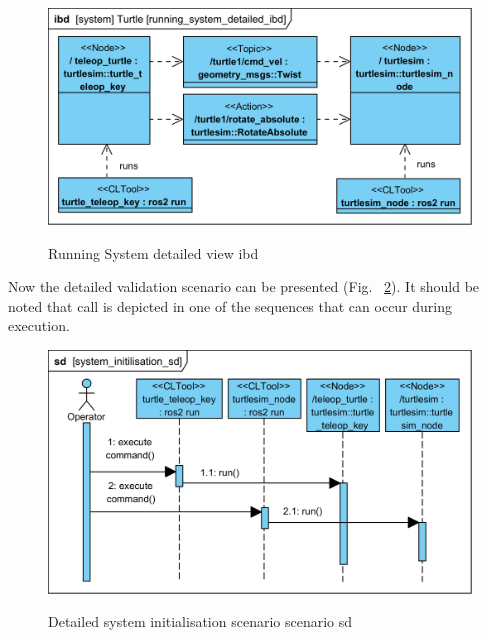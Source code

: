 \documentclass[11pt,oneside,a4paper]{report}
\begin{document}
\begin{figure}[H]
	\centering
	\begin{center}
		{\includegraphics[scale=.9]{diagrams/running_system_detailed_ibd.png}}
	\end{center}
	\caption{Running System detailed view ibd}
	\label{fig:running_system_detailed_ibd}
\end{figure}
			
Now the detailed validation scenario can be presented (Fig.~ \ref{fig:system_initilisation_sd}). It should be noted that \stAction{} call is depicted in one of the sequences that can occur during \stSystem{} execution.
			
\begin{figure}[H]
	\centering
	\begin{center}
		{\includegraphics[scale=.9]{diagrams/system_initilisation_sd.png}}
	\end{center}
	\caption{Detailed system initialisation scenario scenario sd}
	\label{fig:system_initilisation_sd}
\end{figure}
\end{document}

